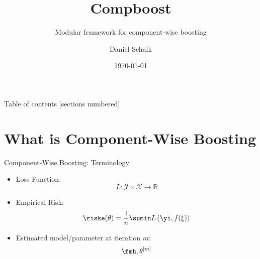



\usepackage[]{algorithm2e}
\usepackage{csquotes}
\usepackage{dsfont}


\title{Compboost}
\subtitle{Modular framework for component-wise boosting}
\date{\today}
\author{Daniel Schalk}


\usepackage{Sweave}

\let\OldSchunk\Schunk
\let\endOldSchunk\endSchunk

\renewenvironment{Schunk}
 {\small\begin{Shaded}\OldSchunk}
 {\endOldSchunk\end{Shaded}\normalsize}

 





\maketitle

\begin{frame}[plain]{Table of contents}
	[sections numbered]
	\tableofcontents[hideallsubsections]
\end{frame}


\section{What is Component-Wise Boosting}
\begin{frame}[fragile]{Component-Wise Boosting: Terminology}


\begin{itemize}

  \item
    Loss Function: 
    \[
      L: \mathcal{Y} \times \mathcal{X} \rightarrow \mathbb{R}
    \]

  \item
    Empirical Risk:
    \[
      \riske(\theta) = \frac{1}{n} \sumin L\left(\yi, f(\xi)\right)
    \]

  \item 
    Estimated model/parameter at iteration $m$: 
    \[
      \fmh, \theta^{[m]}
    \]

\end{itemize}


\end{frame}



